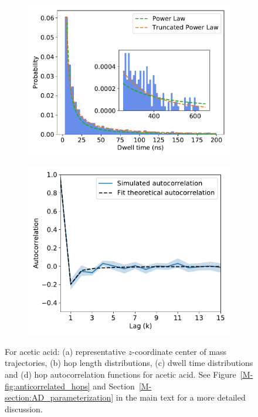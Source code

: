 \documentclass{article}
\begin{document}
\begin{figure}
  \begin{subfigure}{0.45\textwidth}
  \includegraphics[width=\textwidth]{ACH_powerlaw.pdf}
  \caption{}\label{fig:ACH_powerlaw}
  \end{subfigure}
  \begin{subfigure}{0.45\textwidth}
  \includegraphics[width=\textwidth]{ACH_hop_acf.pdf}
  \caption{}\label{fig:ACH_hop_acf}
  \end{subfigure}
  \caption{For acetic acid: (a) representative $z$-coordinate center of mass trajectories, (b) hop 
  length distributions, (c) dwell time distributions and (d) hop autocorrelation functions
  for acetic acid. See Figure~\ref{M-fig:anticorrelated_hops} and Section~\ref{M-section:AD_parameterization}
  in the main text for a more detailed discussion.}\label{fig:ACH_anticorrelated_hops}
  \end{figure}
  
\end{document}
